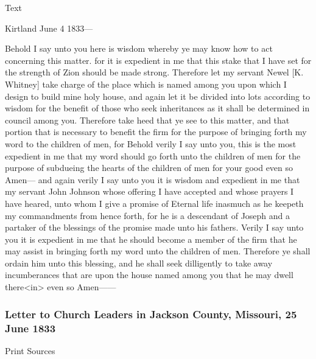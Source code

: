 			\begin{description}
				\item[Text]
			\end{description}
			
				\begin{tightcenter}
				Kirtland June 4 1833---
				\end{tightcenter}
				
				Behold I say unto you here is wisdom whereby ye may know how to act concerning this matter. for it is expedient in me that this stake that I have set for the strength of Zion should be made strong. Therefore let my servant Newel [K. Whitney] take charge of the place which is named among you upon which I design to build mine holy house, and again let it be divided into lots according to wisdom for the benefit of those who seek inheritances as it shall be determined in council among you. Therefore take heed that ye see to this matter, and that portion that is necessary to benefit the firm for the purpose of bringing forth my word to the children of men, for Behold verily I say unto you, this is the most expedient in me that my word should go forth unto the children of men for the purpose of subdueing the hearts of the children of men for your good even so Amen--- and again verily I say unto you it is wisdom and expedient in me that my servant John Johnson whose offering I have accepted and whose prayers I have heared, unto whom I give a promise of Eternal life inasmuch as he keepeth my commandments from hence forth, for he is a descendant of Joseph and a partaker of the blessings of the promise made unto his fathers. Verily I say unto you it is expedient in me that he should become a member of the firm that he may assist in bringing forth my word unto the children of men. Therefore ye shall ordain him unto this blessing, and he shall seek dilligently to take away incumberances that are upon the house named among you that he may dwell there<in> even so Amen------
				
		\subsubsection{Letter to Church Leaders in Jackson County, Missouri, 25 June 1833}
			\label{EMS-1833-JS-25-JUN-1833}
		
			\begin{description}
				\item[Print Sources]
			\end{description}

